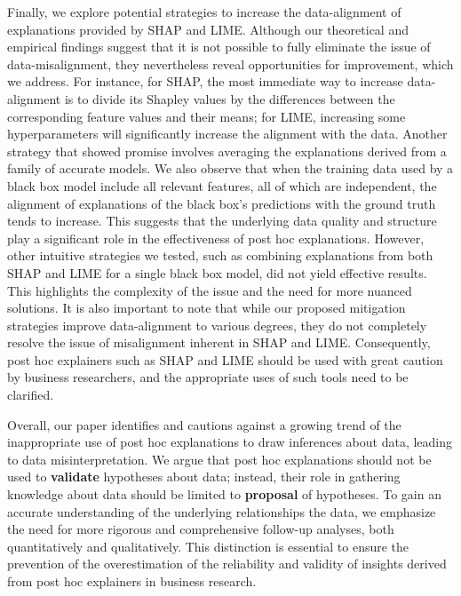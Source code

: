 \documentclass[mnsc,blindrev]{informs3}
\begin{document}
Finally, we explore potential strategies to increase the data-alignment of explanations provided by SHAP and LIME. Although our theoretical and empirical findings suggest that it is not possible to fully eliminate the issue of data-misalignment, they nevertheless reveal opportunities for improvement, which we address. For instance, for SHAP, the most immediate way to increase data-alignment is to divide its Shapley values by the differences between the corresponding feature values and their means; for LIME, increasing some hyperparameters will significantly increase the alignment with the data.
Another strategy that showed promise involves averaging the explanations derived from a family of accurate models. We also observe that when the training data used by a black box model include all relevant features, all of which are independent, the alignment of explanations of the black box's predictions with the ground truth tends to increase. This suggests that the underlying data quality and structure play a significant role in the effectiveness of post hoc explanations.
However, other intuitive strategies we tested, such as combining explanations from both SHAP and LIME for a single black box model, did not yield effective results. This highlights the complexity of the issue and the need for more nuanced solutions.
It is also important to note that while our proposed mitigation strategies improve data-alignment to various degrees, they do not completely resolve the issue of misalignment inherent in SHAP and LIME. Consequently, post hoc explainers such as SHAP and LIME should be used with great caution by business researchers, and the appropriate uses of such tools need to be clarified.


Overall, our paper identifies and cautions against a growing trend of the inappropriate use of post hoc explanations to draw inferences about data, leading to data misinterpretation. We argue that post hoc explanations should not be used to \textbf{validate} hypotheses about data; instead, their role in gathering knowledge about data should be limited to \textbf{proposal} of hypotheses. To gain an accurate understanding of the underlying relationships  the data, we emphasize the need for more rigorous and comprehensive follow-up analyses, both quantitatively and qualitatively. This distinction is essential to ensure the prevention of the overestimation of the reliability and validity of insights derived from post hoc explainers in business research.
\end{document}
